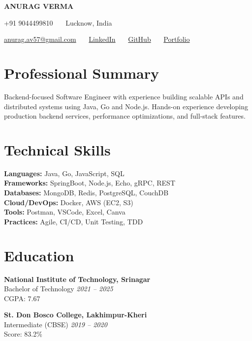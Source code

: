 \documentclass[10pt,a4paper]{article}
\newcommand{\headingfont}{\bfseries} %
\newcommand{\name}[1]{\centerline{\headingfont\fontsize{22}{26}\selectfont\uppercase{#1}}}
\newcommand{\contact}[1]{\centerline{#1}}
\newcommand{\sep}{ \ \textbar\ \ }
\begin{document}
\name{Anurag Verma}
\vspace{0.3em}
\contact{+91 9044499810 \sep Lucknow, India}
\vspace{0.3em}
\contact{\href{mailto:anurag.av57@gmail.com}{anurag.av57@gmail.com} \sep \href{https://linkedin.com/in/anuragverma57}{LinkedIn} \sep \href{https://github.com/anuragverma57}{GitHub} \sep \href{https://anuragverma57.github.io/}{Portfolio}}

\vspace{-0.4em}

\section*{Professional Summary}
Backend-focused Software Engineer with experience building scalable APIs and distributed systems using Java, Go and Node.js. Hands-on experience developing production backend services, performance optimizations, and full-stack features.

\vspace{0.4em}
\noindent
\begin{minipage}[t]{0.5\textwidth}
\section*{Technical Skills}
\textbf{Languages:} Java, Go, JavaScript, SQL \\
\textbf{Frameworks:} SpringBoot, Node.js, Echo, gRPC, REST \\
\textbf{Databases:} MongoDB, Redis, PostgreSQL, CouchDB \\
\textbf{Cloud/DevOps:} Docker, AWS (EC2, S3) \\
\textbf{Tools:} Postman, VSCode, Excel, Canva \\
\textbf{Practices:} Agile, CI/CD, Unit Testing, TDD \\
\end{minipage}
\hfill
\begin{minipage}[t]{0.42\textwidth}
\section*{Education}
\textbf{National Institute of Technology, Srinagar} \\
Bachelor of Technology \hfill \textit{2021 -- 2025} \\
CGPA: 7.67

\vspace{0.8em}
\textbf{St. Don Bosco College, Lakhimpur-Kheri} \\
Intermediate (CBSE) \hfill \textit{2019 -- 2020} \\
Score: 83.2\%
\end{minipage}
\end{document}
